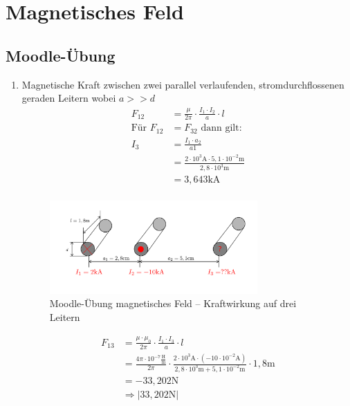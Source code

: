 \section{Magnetisches Feld}
\subsection{Moodle-Übung}
\begin{enumerate}
  \item Magnetische Kraft zwischen zwei parallel verlaufenden, stromdurchflossenen geraden Leitern wobei $a >> d$
    \begin{align*}
      F_{12}&= \frac{\mu}{2\pi}\cdot \frac{I_1\cdot I_2}{a}\cdot l\\
      \text{Für } F_{12} &= F_{32} \text{ dann gilt:}\\
      I_3 &= \frac{I_1\cdot a_2}{a1}\\
      &= \frac{2\cdot 10^{3}\text{A}\cdot 5,1\cdot 10^{-2}\text{m}}{2,8\cdot 10^{3}\text{m}}\\
      &= 3,643\text{kA}\\
    \end{align*}
    \begin{figure}[h!]
      \begin{center}
        \includegraphics[width=0.75\textwidth]{img/Magnetisches-Feld/A1.png}
      \end{center}
      \caption{Moodle-Übung magnetisches Feld – Kraftwirkung auf drei Leitern}
  \end{figure}
  \begin{align*}
    F_{13}&=\frac{\mu\cdot\mu_{0}}{2\pi}\cdot\frac{I_{1}\cdot I_{3}}{a}\cdot l\\
      &=\frac{4\pi\cdot 10^{-7}\frac{\text{H}}{\text{m}}}{2\pi}\cdot\frac{2\cdot 10^{3}\text{A}\cdot(-10\cdot 10^{-2}\text{A})}{2,8\cdot 10^{3}\text{m}+5,1\cdot 10^{-2}\text{m}}\cdot 1,8\text{m}\\
      &=-33,202\text{N}\\
      &\Rightarrow |33,202\text{N}|\\
    \end{align*}


\end{enumerate}
